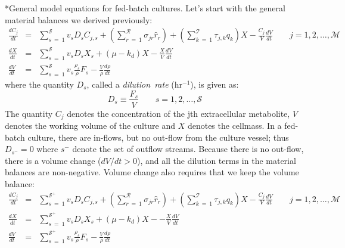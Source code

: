 \documentclass[11pt]{article}
\makeatletter
\theoremstyle{definition}
\renewcommand\subsection{\@startsection
	{subsection}{2}{0mm}
	{-0.05in}
	{-0.5\baselineskip}
	{\normalfont\normalsize\bfseries}}
\makeatother
\begin{document}
\subsection*{General model equations for fed-batch cultures.}
Let's start with the general material balances we derived previously:
\begin{eqnarray}\label{eqn-metabolite-dilution-dynamic}
	\frac{dC_{j}}{dt} &=& \sum_{s~=~1}^{\mathcal{S}}v_{s}D_{s}C_{j,s} + \left(\sum_{r~=~1}^{\mathcal{R}}\sigma_{jr}\hat{r}_{r}\right) + \left(\sum_{k~=~1}^{\mathcal{T}}\tau_{j,k}q_{k}\right)X  - \frac{C_{j}}{V}\frac{dV}{dt}\qquad j=1,2,\dots,\mathcal{M}\\
	\frac{dX}{dt} &=& \sum_{s~=~1}^{\mathcal{S}}v_{s}D_{s}X_{s}+\left(\mu - k_{d}\right)X - \frac{X}{V}\frac{dV}{dt}\\
	\frac{dV}{dt} &=& \sum_{s~=~1}^{\mathcal{S}}v_{s}\frac{\rho_{s}}{\rho}F_{s} - \frac{V}{\rho}\frac{d\rho}{dt}
\end{eqnarray}where the quantity $D_{s}$,  called a \textit{dilution~rate} (hr$^{-1}$), is given as:
\begin{equation}
	D_{s} \equiv \frac{F_{s}}{V}\qquad s=1,2,\dots,\mathcal{S}
\end{equation}The quantity $C_{j}$ denotes the concentration of the jth extracellular metabolite, $V$ denotes the working volume of the culture and $X$ denotes the cellmass.
In a fed-batch culture, there are in-flows, but no out-flow from the culture vessel; thus $D_{s^{-}} = 0$ where $s^{-}$ denote the set of outflow streams.
Because there is no out-flow, there is a volume change ($dV/dt > 0$), and all the dilution terms in the material balances are non-negative.
Volume change also requires that we keep the volume balance:
\begin{eqnarray}\label{eqn-metabolite-batch}
	\frac{dC_{j}}{dt} &=& \sum_{s~=~1}^{\mathcal{S^{+}}}v_{s}D_{s}C_{j,s} + \left(\sum_{r~=~1}^{\mathcal{R}}\sigma_{jr}\hat{r}_{r}\right) + \left(\sum_{k~=~1}^{\mathcal{T}}\tau_{j,k}q_{k}\right)X - \frac{C_{j}}{V}\frac{dV}{dt} \qquad j=1,2,\dots,\mathcal{M}\\
	\frac{dX}{dt} &=& \sum_{s~=~1}^{\mathcal{S^{+}}}v_{s}D_{s}X_{s} + \left(\mu - k_{d}\right)X - - \frac{X}{V}\frac{dV}{dt}\\
	\frac{dV}{dt} &=& \sum_{s~=~1}^{\mathcal{S^{+}}}v_{s}\frac{\rho_{s}}{\rho}F_{s} - \frac{V}{\rho}\frac{d\rho}{dt}
\end{eqnarray}
\end{document}
